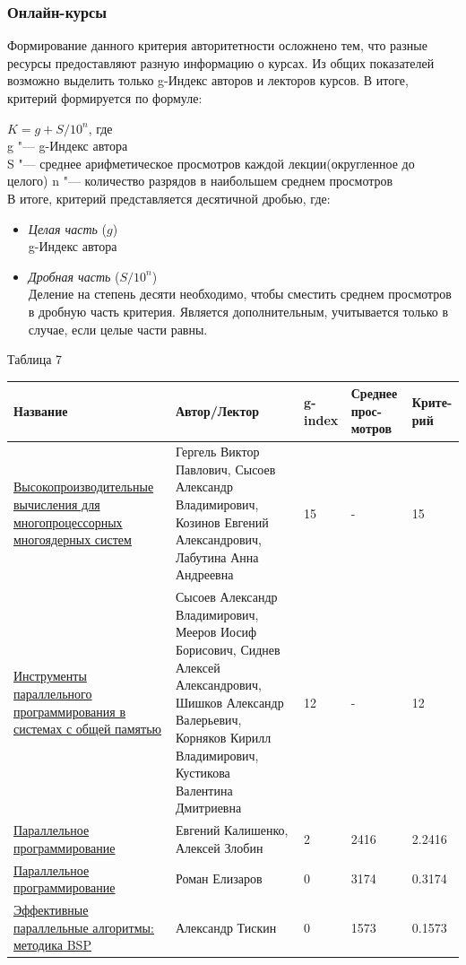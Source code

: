 \documentclass{article}
\begin{document}
		\subsubsection{Онлайн-курсы}
		Формирование данного критерия авторитетности осложнено тем, что разные ресурсы предоставляют разную информацию о курсах. Из общих показателей возможно выделить только g-Индекс авторов и лекторов курсов. В итоге, критерий формируется по формуле:
		 
		 $ K = g + S / 10^n $, где \\
			g "--- g-Индекс автора\\
			S "--- среднее арифметическое просмотров каждой лекции(округленное до целого)
			n "--- количество разрядов в наибольшем среднем просмотров\\			
			В итоге, критерий представляется десятичной дробью, где: 
				\begin{itemize}
					\item \textit{Целая часть} ($g$)\\
						g-Индекс автора
					\item \textit{Дробная часть} ($S / 10^n$)\\
						Деление на степень десяти необходимо, чтобы сместить среднем просмотров в дробную часть критерия. Является дополнительным, учитывается только в случае, если целые части равны.
				\end{itemize}
			\begin{flushleft}
				Таблица 7
				\begin{longtable}{|p{5.5cm}|p{5cm}|p{1.55cm}|p{1.7cm}|p{1.5cm}|}
\hline
Название & Автор/Лектор & g-index & Среднее прос-мотров & Крите-рий \\\hline

\href{http://www.hpcc.unn.ru/?doc=489}{Высокопроизводительные вычисления для многопроцессорных многоядерных систем} &
Гергель Виктор Павлович, Сысоев Александр Владимирович, Козинов Евгений Александрович, Лабутина Анна Андреевна & 15 & - & 15\\\hline

\href{http://www.hpcc.unn.ru/?doc=444}{Инструменты параллельного программирования в системах с общей памятью} &
Сысоев Александр Владимирович, Мееров Иосиф Борисович, Сиднев Алексей Александрович, Шишков Александр Валерьевич, Корняков Кирилл Владимирович, Кустикова Валентина Дмитриевна &
12 & - & 12\\\hline

\href{https://www.lektorium.tv/course/23050 }{Параллельное программирование} &
Евгений Калишенко, Алексей Злобин & 2 & 2416 & 2.2416\\\hline

\href{https://www.lektorium.tv/course/22757}{Параллельное программирование} &
Роман Елизаров & 0 & 3174 & 0.3174 \\\hline

\href{https://www.lektorium.tv/course/22913}{Эффективные параллельные алгоритмы: методика BSP} &
Александр Тискин & 0 & 1573 & 0.1573 \\\hline

				\end{longtable}
			\end{flushleft}
\end{document}
